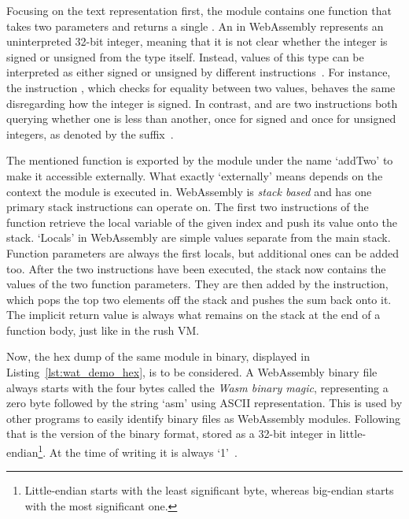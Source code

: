 
Focusing on the text representation first, the module contains one function that takes two  parameters and returns a single .
An  in WebAssembly represents an uninterpreted 32-bit integer, meaning that it is not clear whether the integer is signed or unsigned from the type itself.
Instead, values of this type can be interpreted as either signed or unsigned by different instructions~\cite[Section~2.3.1]{WasmSpec}.
For instance, the instruction , which checks for equality between two  values, behaves the same disregarding how the integer is signed.
In contrast,  and  are two instructions both querying whether one  is less than another, once for signed and once for unsigned integers, as denoted by the suffix~\cite[p.46]{Sendil2022-fy}.

The mentioned function is exported by the module under the name `addTwo' to make it accessible externally.
What exactly `externally' means depends on the context the module is executed in.
WebAssembly is \emph{stack based} and has one primary stack instructions can operate on.
The first two instructions of the  function retrieve the local variable of the given index and push its value onto the stack.
`Locals' in WebAssembly are simple values separate from the main stack.
Function parameters are always the first locals, but additional ones can be added too.
After the two instructions have been executed, the stack now contains the values of the two function parameters.
They are then added by the  instruction, which pops the top two elements off the stack and pushes the sum back onto it.
The implicit return value is always what remains on the stack at the end of a function body, just like in the rush VM\@.

Now, the hex dump of the same module in binary, displayed in Listing~\ref{lst:wat_demo_hex}, is to be considered.
A WebAssembly binary file always starts with the four bytes  called the \emph{Wasm binary magic}, representing a zero byte followed by the string `asm' using ASCII representation.
This is used by other programs to easily identify binary files as WebAssembly modules.
Following that is the version of the binary format, stored as a 32-bit integer in little-endian\footnote{Little-endian starts with the least significant byte, whereas big-endian starts with the most significant one.}.
At the time of writing it is always `1'~\cite[Section~5.5.16]{WasmSpec}.

